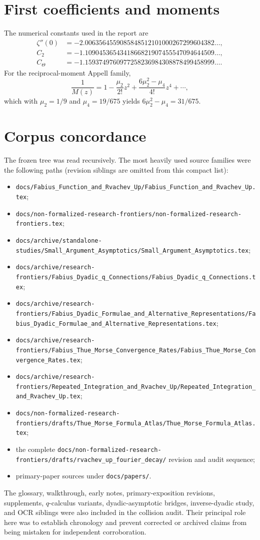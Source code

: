 \documentclass[11pt]{article}
\numberwithin{equation}{section}
\theoremstyle{definition}
\theoremstyle{remark}
\begin{document}
\section{First coefficients and moments}
\label{p2:app:coefficients}

The numerical constants used in the report are
\begin{align*}
 \zeta''(0)&=-2.0063564559085848512101000267299604382\ldots,\\
 C_2&=-1.1090453654341866821907455547094644509\ldots,\\
 C_{\Theta}&=-1.1593749760977258236984308878499458999\ldots.
\end{align*}
For the reciprocal-moment Appell family,
\[
 \frac1{M(z)}=1-\frac{\mu_2}{2!}z^2
 +\frac{6\mu_2^2-\mu_4}{4!}z^4+\cdots,
\]
which with $\mu_2=1/9$ and $\mu_4=19/675$ yields
$6\mu_2^2-\mu_4=31/675$.

\section{Corpus concordance}
\label{p2:app:corpus}

The frozen tree was read recursively.  The most heavily used source families
were the following paths (revision siblings are omitted from this compact list):
\begin{itemize}
\item \nolinkurl{docs/Fabius_Function_and_Rvachev_Up/Fabius_Function_and_Rvachev_Up.tex};
\item \nolinkurl{docs/non-formalized-research-frontiers/non-formalized-research-frontiers.tex};
\item \nolinkurl{docs/archive/standalone-studies/Small_Argument_Asymptotics/Small_Argument_Asymptotics.tex};
\item \nolinkurl{docs/archive/research-frontiers/Fabius_Dyadic_q_Connections/Fabius_Dyadic_q_Connections.tex};
\item \nolinkurl{docs/archive/research-frontiers/Fabius_Dyadic_Formulae_and_Alternative_Representations/Fabius_Dyadic_Formulae_and_Alternative_Representations.tex};
\item \nolinkurl{docs/archive/research-frontiers/Fabius_Thue_Morse_Convergence_Rates/Fabius_Thue_Morse_Convergence_Rates.tex};
\item \nolinkurl{docs/archive/research-frontiers/Repeated_Integration_and_Rvachev_Up/Repeated_Integration_and_Rvachev_Up.tex};
\item \nolinkurl{docs/non-formalized-research-frontiers/drafts/Thue_Morse_Formula_Atlas/Thue_Morse_Formula_Atlas.tex};
\item the complete \nolinkurl{docs/non-formalized-research-frontiers/drafts/rvachev_up_fourier_decay/} revision and audit sequence;
\item primary-paper sources under \nolinkurl{docs/papers/}.
\end{itemize}
The glossary, walkthrough, early notes, primary-exposition revisions, supplements,
$q$-calculus variants, dyadic-asymptotic bridges, inverse-dyadic study, and OCR
siblings were also included in the collision audit.  Their principal role here
was to establish chronology and prevent corrected or archived claims from being
mistaken for independent corroboration.
\end{document}
